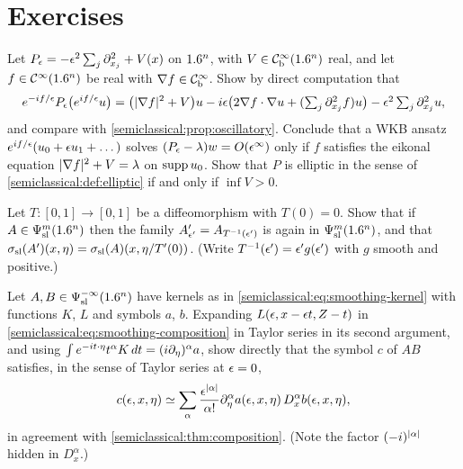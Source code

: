 \section{Exercises}\label{semiclassical:sec:exercises}

\begin{exercise}\label{semiclassical:ex:wkb}
  Let $P_\epsilon=-\epsilon^2\sum_j\partial_{x_j}^2+V(x)$ on $1.6^n$, with $V\in\mathcal{C}^\infty_{\mathrm{b}}(1.6^n)$ real, and let
  $f\in\mathcal{C}^\infty(1.6^n)$ be real with $\nabla f\in\mathcal{C}^\infty_{\mathrm{b}}$. Show by direct computation that
  \begin{equation*}
    e^{-if/\epsilon}P_\epsilon\bigl(e^{if/\epsilon}u\bigr)=\bigl(\lvert \nabla f\rvert^2+V\bigr)u
    -i\epsilon\bigl(2\nabla f\cdot\nabla u+(\textstyle\sum_j\partial_{x_j}^2f)u\bigr)-\epsilon^2\textstyle\sum_j\partial_{x_j}^2u,
  \end{equation*}
  and compare with \cref{semiclassical:prop:oscillatory}. Conclude that a WKB ansatz
  $e^{if/\epsilon}(u_0+\epsilon u_1+\dots)$ solves $(P_\epsilon-\lambda)w=O(\epsilon^\infty)$ only if $f$ satisfies the
  eikonal equation $\lvert \nabla f\rvert^2+V=\lambda$ on $\operatorname{supp} u_0$. Show that $P$ is elliptic in
  the sense of \cref{semiclassical:def:elliptic} if and only if $\inf V>0$.
\end{exercise}

\begin{exercise}\label{semiclassical:ex:reparametrize}
  Let $T:[0,1]\to[0,1]$ be a diffeomorphism with $T(0)=0$. Show that if
  $A\in\Psi^{m}_{\mathrm{sl}}(1.6^n)$ then the family $A'_{\epsilon'}=A_{T^{-1}(\epsilon')}$ is again in
  $\Psi^{m}_{\mathrm{sl}}(1.6^n)$, and that $\sigma_{\mathrm{sl}}(A')(x,\eta)=\sigma_{\mathrm{sl}}(A)(x,\eta/T'(0))$. (Write
  $T^{-1}(\epsilon')=\epsilon'g(\epsilon')$ with $g$ smooth and positive.)
\end{exercise}

\begin{exercise}\label{semiclassical:ex:smoothing-expansion}
  Let $A,B\in\Psi^{-\infty}_{\mathrm{sl}}(1.6^n)$ have kernels as in
  \eqref{semiclassical:eq:smoothing-kernel} with functions $K$, $L$ and symbols $a$, $b$.
  Expanding $L(\epsilon,x-\epsilon t,Z-t)$ in \eqref{semiclassical:eq:smoothing-composition} in Taylor
  series in its second argument, and using $\int e^{-it\cdot\eta}t^\alpha K\,dt=(i\partial_\eta)^\alpha a$,
  show directly that the symbol $c$ of $AB$ satisfies, in the sense of Taylor series at
  $\epsilon=0$,
  \begin{equation*}
    c(\epsilon,x,\eta)\simeq\sum_\alpha\frac{\epsilon^{\lvert \alpha\rvert}}{\alpha!}\partial^\alpha_\eta a(\epsilon,x,\eta)\,D^\alpha_xb(\epsilon,x,\eta),
  \end{equation*}
  in agreement with \cref{semiclassical:thm:composition}. (Note the factor
  $(-i)^{\lvert \alpha\rvert}$ hidden in $D^\alpha_x$.)
\end{exercise}

